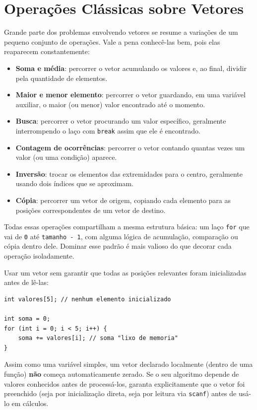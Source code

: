 \documentclass[12pt,a4paper,oneside]{extreport}
\begin{document}
\section{Operações Clássicas sobre Vetores}

Grande parte dos problemas envolvendo vetores se resume a variações de um pequeno conjunto de operações. Vale a pena conhecê-las bem, pois elas reaparecem constantemente:

\begin{itemize}
    \item \textbf{Soma e média}: percorrer o vetor acumulando os valores e, ao final, dividir pela quantidade de elementos.
    \item \textbf{Maior e menor elemento}: percorrer o vetor guardando, em uma variável auxiliar, o maior (ou menor) valor encontrado até o momento.
    \item \textbf{Busca}: percorrer o vetor procurando um valor específico, geralmente interrompendo o laço com \texttt{break} assim que ele é encontrado.
    \item \textbf{Contagem de ocorrências}: percorrer o vetor contando quantas vezes um valor (ou uma condição) aparece.
    \item \textbf{Inversão}: trocar os elementos das extremidades para o centro, geralmente usando dois índices que se aproximam.
    \item \textbf{Cópia}: percorrer um vetor de origem, copiando cada elemento para as posições correspondentes de um vetor de destino.
\end{itemize}

Todas essas operações compartilham a mesma estrutura básica: um laço \texttt{for} que vai de \texttt{0} até \texttt{tamanho - 1}, com alguma lógica de acumulação, comparação ou cópia dentro dele. Dominar esse padrão é mais valioso do que decorar cada operação isoladamente.

\begin{errocomum}
Usar um vetor sem garantir que todas as posições relevantes foram inicializadas antes de lê-las:
\begin{lstlisting}
int valores[5]; // nenhum elemento inicializado

int soma = 0;
for (int i = 0; i < 5; i++) {
    soma += valores[i]; // soma "lixo de memoria"
}
\end{lstlisting}
Assim como uma variável simples, um vetor declarado localmente (dentro de uma função) \textbf{não} começa automaticamente zerado. Se o seu algoritmo depende de valores conhecidos antes de processá-los, garanta explicitamente que o vetor foi preenchido (seja por inicialização direta, seja por leitura via \texttt{scanf}) antes de usá-lo em cálculos.
\end{errocomum}
\end{document}
